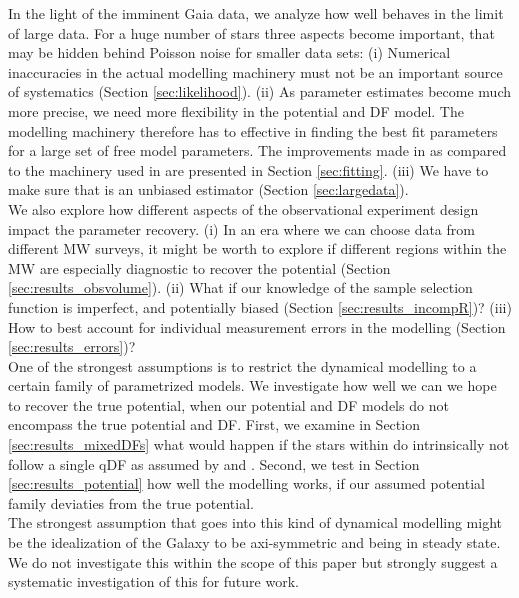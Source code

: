 In the light of the imminent Gaia data, we analyze how well \RM{} behaves in the limit of large data. For a huge number of stars three aspects become important, that may be hidden behind Poisson noise for smaller data sets: (i) Numerical inaccuracies in the actual modelling machinery must not be an important source of systematics (Section \ref{sec:likelihood}). (ii) As parameter estimates become much more precise, we need more flexibility in the potential and DF model. The modelling machinery therefore has to effective in finding the best fit parameters for a large set of free model parameters. The improvements made in \RM{} as compared to the machinery used in \citet{bov13} are presented in Section \ref{sec:fitting}. (iii) We have to make sure that \RM{} is an unbiased estimator (Section \ref{sec:largedata}). \\

We also explore how different aspects of the observational experiment design impact the parameter recovery. (i) In an era where we can choose data from different MW surveys, it might be worth to explore if different regions within the MW are especially diagnostic to recover the potential (Section \ref{sec:results_obsvolume}). (ii) What if our knowledge of the sample selection function is imperfect, and potentially biased (Section \ref{sec:results_incompR})? (iii) How to best account for individual measurement errors in the modelling (Section \ref{sec:results_errors})? \\

One of the strongest assumptions is to restrict the dynamical modelling to a certain family of parametrized models. We investigate how well we can we hope to recover the true potential, when our potential and DF models do not encompass the true potential and DF. First, we examine in Section \ref{sec:results_mixedDFs} what would happen if the stars within \MAPs{} do intrinsically not follow a single qDF as assumed by \citet{tin13} and \citet{bov13}. Second, we test in Section \ref{sec:results_potential} how well the modelling works, if our assumed potential family deviaties from the true potential.\\

The strongest assumption that goes into this kind of dynamical modelling might be the idealization of the Galaxy to be axi-symmetric and being in steady state. We do not investigate this within the scope of this paper but strongly suggest a systematic investigation of this for future work.\\

